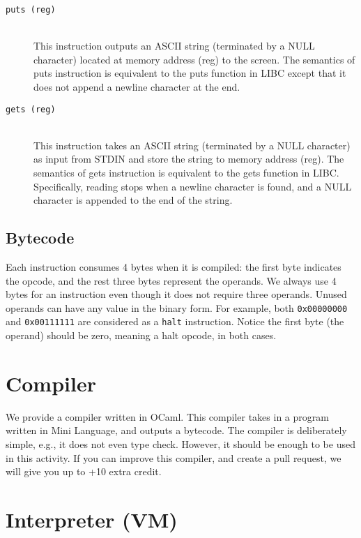\documentclass[a4paper, 11pt]{article}
\theoremstyle{definition}
\begin{document}
{\begin{description}
  \item [\texttt{puts (reg)}]~\\
    This instruction outputs an ASCII string (terminated by a NULL
    character) located at memory address (reg) to the screen. The
    semantics of puts instruction is equivalent to the puts function
    in LIBC except that it does not append a newline character at the
    end.

  \item [\texttt{gets (reg)}]~\\
    This instruction takes an ASCII string (terminated by a NULL
    character) as input from STDIN and store the string to memory
    address (reg). The semantics of gets instruction is equivalent to
    the gets function in LIBC. Specifically, reading stops when a
    newline character is found, and a NULL character is appended to
    the end of the string.

\end{description}

\subsection{Bytecode}

Each instruction consumes 4 bytes when it is compiled: the first byte
indicates the opcode, and the rest three bytes represent the operands.
We always use 4 bytes for an instruction even though it does not
require three operands. Unused operands can have any value in the
binary form. For example, both \texttt{0x00000000} and
\texttt{0x00111111} are considered as a \texttt{halt} instruction.
Notice the first byte (the operand) should be zero, meaning a halt
opcode, in both cases.

\section{Compiler}

We provide a compiler written in OCaml. This compiler takes in a
program written in Mini Language, and outputs a bytecode. The compiler
is deliberately simple, e.g., it does not even type check. However, it
should be enough to be used in this activity. If you can improve this
compiler, and create a pull request, we will give you up to +10 extra
credit.

\section{Interpreter (VM)}

}
\end{document}
